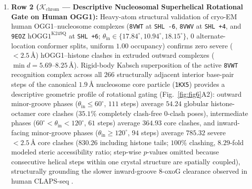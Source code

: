 \documentclass[10pt,letterpaper]{article}
\theoremstyle{plain}
\theoremstyle{definition}
\newcommand{\oxog}{\text{8-oxoG}}
\begin{document}
\begin{enumerate}[leftmargin=1.8em,itemsep=2pt]
    \item \textbf{Row 2 ($\mathcal{K}_{\mathrm{chrom}}$ --- Descriptive Nucleosomal Superhelical Rotational Gate on Human OGG1):} Heavy-atom structural validation of cryo-EM human OGG1--nucleosome complexes (\texttt{8VWT} at \texttt{SHL -6}, \texttt{8VWV} at \texttt{SHL +4}, and \texttt{9EOZ} $\mathrm{hOGG1^{K249Q}}$ at \texttt{SHL +6}; $\theta_{\mathrm{in}} \in \{17.84^\circ, 10.94^\circ, 18.15^\circ\}$, $0$ alternate-location conformer splits, uniform $1.00$ occupancy) \cite{ren2024natcommun} confirms zero severe ($<2.5\,\text{\AA}$) hOGG1--histone clashes in extruded outward complexes ($\min d = 5.69$--$8.25\,\text{\AA}$). Rigid-body Kabsch superposition of the active \texttt{8VWT} recognition complex across all $266$ structurally adjacent interior base-pair steps of the canonical $1.9\,\text{\AA}$ nucleosome core particle (\texttt{1KX5}) provides a descriptive geometric profile of rotational gating (Fig.~\ref{fig:fig6}A2): outward minor-groove phases ($\theta_{\mathrm{in}} \le 60^\circ$, $111$ steps) average $54.24$ globular histone-octamer core clashes ($35.1\%$ completely clash-free $0$-clash poses), intermediate phases ($60^\circ < \theta_{\mathrm{in}} < 120^\circ$, $61$ steps) average $364.93$ core clashes, and inward-facing minor-groove phases ($\theta_{\mathrm{in}} \ge 120^\circ$, $94$ steps) average $785.32$ severe $<2.5\,\text{\AA}$ core clashes ($830.26$ including histone tails; $100\%$ clashing, $8.29$-fold modeled steric accessibility ratio; step-wise $p$-values omitted because consecutive helical steps within one crystal structure are spatially coupled), structurally grounding the slower inward-groove $\oxog$ clearance observed in human CLAPS-seq \cite{li2025nar,cordero2024natcommun}.

\end{enumerate}
\end{document}
